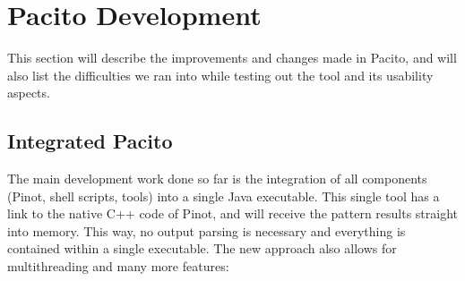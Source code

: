 \section{Pacito Development}
\label{sec:pacito_dev}
This section will describe the improvements and changes made in Pacito, and will also list the difficulties we ran into while testing out the tool and its usability aspects.

\subsection{Integrated Pacito}
The main development work done so far is the integration of all components (Pinot, shell scripts, tools) into a single Java executable. This single tool has a link to the native C++ code of Pinot, and will receive the pattern results straight into memory. This way, no output parsing is necessary and everything is contained within a single executable. The new approach also allows for multithreading and many more features:
